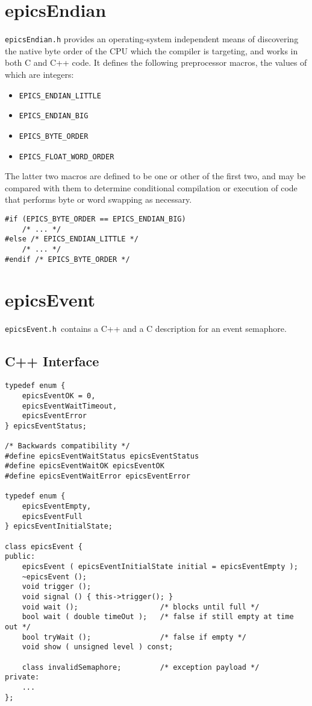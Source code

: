 \section{epicsEndian}

\verb|epicsEndian.h| provides an operating-system independent means of discovering the native byte order of the CPU which the compiler is targeting, and works in both C and C++ code.
It defines the following preprocessor macros, the values of which are integers:

\begin{itemize}
\item \verb|EPICS_ENDIAN_LITTLE|
\item \verb|EPICS_ENDIAN_BIG|
\item \verb|EPICS_BYTE_ORDER|
\item \verb|EPICS_FLOAT_WORD_ORDER|
\end{itemize}

The latter two macros are defined to be one or other of the first two, and may be compared with them to determine conditional compilation or execution of code that performs byte or word swapping as necessary.

\begin{verbatim}
#if (EPICS_BYTE_ORDER == EPICS_ENDIAN_BIG)
    /* ... */
#else /* EPICS_ENDIAN_LITTLE */
    /* ... */
#endif /* EPICS_BYTE_ORDER */
\end{verbatim}

\section{epicsEvent}

\verb|epicsEvent.h |contains a C++ and a C description for an event semaphore.

\subsection{C++ Interface}

\begin{verbatim}
typedef enum {
    epicsEventOK = 0,
    epicsEventWaitTimeout,
    epicsEventError
} epicsEventStatus;

/* Backwards compatibility */
#define epicsEventWaitStatus epicsEventStatus
#define epicsEventWaitOK epicsEventOK
#define epicsEventWaitError epicsEventError

typedef enum {
    epicsEventEmpty,
    epicsEventFull
} epicsEventInitialState;

class epicsEvent {
public:
    epicsEvent ( epicsEventInitialState initial = epicsEventEmpty );
    ~epicsEvent ();
    void trigger ();
    void signal () { this->trigger(); }
    void wait ();                   /* blocks until full */
    bool wait ( double timeOut );   /* false if still empty at time out */
    bool tryWait ();                /* false if empty */
    void show ( unsigned level ) const;

    class invalidSemaphore;         /* exception payload */
private:
    ...
};
\end{verbatim}


